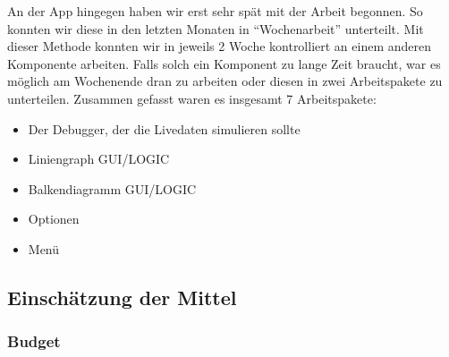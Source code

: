 An der App hingegen haben wir erst sehr spät mit der Arbeit begonnen. So konnten wir diese in den letzten Monaten in ``Wochenarbeit'' unterteilt. Mit dieser Methode konnten wir in jeweils 2 Woche kontrolliert an einem anderen Komponente arbeiten. Falls solch ein Komponent zu lange Zeit braucht, war es möglich am Wochenende dran zu arbeiten oder diesen in zwei Arbeitspakete zu unterteilen. Zusammen gefasst waren es insgesamt 7 Arbeitspakete:
\begin{itemize}
	\item Der Debugger, der die Livedaten simulieren sollte
	\item Liniengraph GUI/LOGIC
	\item Balkendiagramm GUI/LOGIC
	\item Optionen
	\item Menü
\end{itemize}

\subsection{Einschätzung der Mittel}
\subsubsection{Budget}
\label{subsubsec:Budget}

